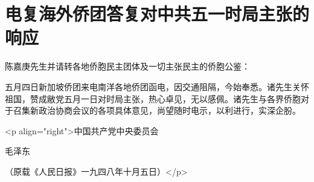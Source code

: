 \section[电复海外侨团答复对中共五一时局主张的响应（一九四八年十月一日）]{电复海外侨团答复对中共五一时局主张的响应}


陈嘉庚先生并请转各地侨胞民主团体及一切主张民主的侨胞公鉴：

五月四日新加坡侨团来电南洋各地侨团函电，因交通阻隔，今始奉悉。诸先生关怀祖国，赞成敝党五月一日对时局主张，热心卓见，无以感佩。诸先生与各界侨胞对于召集新政治协商会议的各项具体意见，尚望随时电示，以利进行，实深企朌。

<p align="right">中国共产党中央委员会

毛泽东

（原载《人民日报》一九四八年十月五日）</p>

